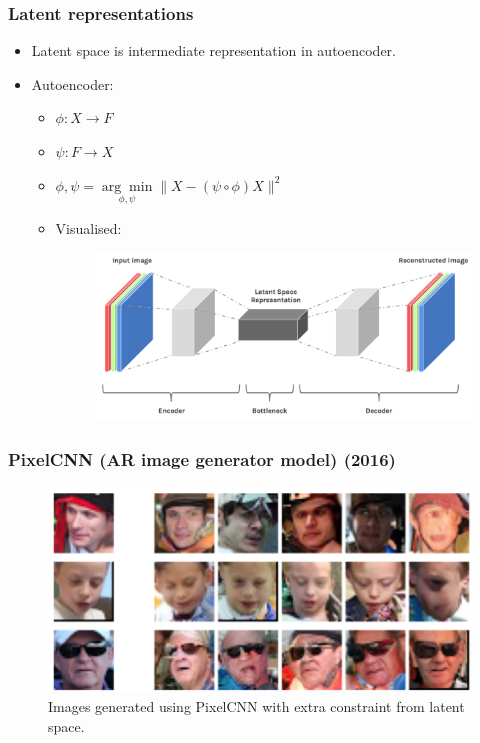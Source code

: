 \documentclass[xcolor=dvipsnames]{beamer}
\begin{document}
\begin{frame}
\frametitle{Latent representations}
\begin{itemize}
	\item Latent space is intermediate representation in autoencoder.
	\item Autoencoder:
	\begin{itemize}
		\item $\phi : X \rightarrow F$
		\item $\psi : F \rightarrow X$
		\item $\phi , \psi = \underset { \phi , \psi } { \arg \min } \| X - ( \psi \circ \phi ) X \| ^ { 2 }$
		\item Visualised:
			\begin{figure}
			\includegraphics[width=\linewidth]{img/autoenc.png}	
			\end{figure}
	\end{itemize}
\end{itemize}
\end{frame}



\begin{frame}
\frametitle{PixelCNN (AR image generator model)\cite{pixelcnn} (2016)}
\begin{figure}
	\includegraphics[width=\linewidth]{img/pixelcnn_small.png}
	\caption{Images generated using PixelCNN\cite{pixelcnn} with extra constraint from latent space.}
\end{figure}
\end{frame}
\end{document}
